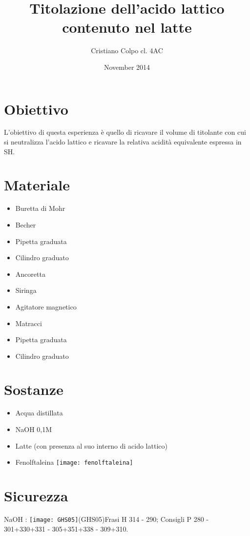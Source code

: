 \documentclass{article}
\title{Titolazione dell'acido lattico contenuto nel latte}
\author{Cristiano Colpo cl. 4AC}
\date{November 2014}
\begin{document}
\maketitle

\section{Obiettivo}
L'obiettivo di questa esperienza è quello di ricavare il volume di titolante con cui si neutralizza l'acido lattico e ricavare la relativa acidità equivalente espressa in \textdegree SH. 

\section{Materiale}
\begin{multicols}{2}
\renewcommand{\labelitemi}{$\square$}
\begin{itemize}
    \item Buretta di Mohr
    \item Becher
    \item Pipetta graduata
    \item Cilindro graduato
    \item Ancoretta
    \item Siringa
    \item Agitatore magnetico
    \item Matracci
    \item Pipetta graduata
    \item Cilindro graduato
\end{itemize}
\end{multicols}

\section{Sostanze}
\begin{multicols}{2}
\renewcommand{\labelitemi}{$\square$}
\begin{itemize}
    \item Acqua distillata
    \item NaOH 0,1M
    \item Latte (con presenza al suo interno di acido lattico)
    \item Fenolftaleina \texttt{[image: fenolftaleina]}
\end{itemize}
\end{multicols}

\section{Sicurezza}
NaOH : \texttt{[image: GHS05]}(GHS05)Frasi H	314 - 290; Consigli P	280 - 301+330+331 - 305+351+338 - 309+310.
\end{document}
